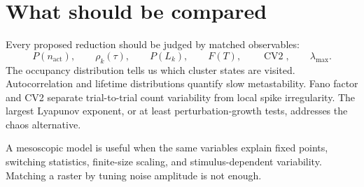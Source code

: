 \section*{What should be compared}

Every proposed reduction should be judged by matched observables:
\[
  P(n_{\mathrm{act}}),
  \qquad
  \rho_k(\tau),
  \qquad
  P(L_k),
  \qquad
  F(T),
  \qquad
  \operatorname{CV2},
  \qquad
  \lambda_{\max}.
\]
The occupancy distribution tells us which cluster states are visited. Autocorrelation and lifetime distributions quantify slow metastability. Fano factor and CV2 separate trial-to-trial count variability from local spike irregularity. The largest Lyapunov exponent, or at least perturbation-growth tests, addresses the chaos alternative.

\begin{aside}
A mesoscopic model is useful when the same variables explain fixed points, switching statistics, finite-size scaling, and stimulus-dependent variability. Matching a raster by tuning noise amplitude is not enough.
\end{aside}
